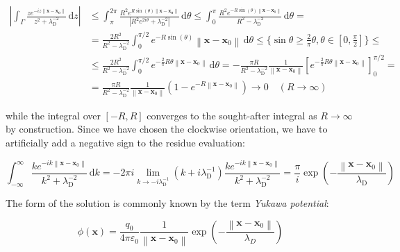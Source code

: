 \begin{align*}
    \left|\int_\Gamma\frac{ze^{-iz\|\mathbf{x}-\mathbf{x_0}\|}}{z^2+\lambda_{\mathrm{D}}^{-2}}\,\mathrm{d}z\right|&\leq\int_\pi^{2\pi}\frac{R^2e^{R \sin{\left(\theta\right)}\|\mathbf{x}-\mathbf{x_0}\|}}{\left|R^2e^{2i\theta}+\lambda_{\mathrm{D}}^{-2}\right|}\,\mathrm{d}\theta\leq\int_0^\pi \frac{R^2e^{-R \sin{\left(\theta\right)} \left\|\mathbf{x}-\mathbf{x}_0\right\|}}{R^2-\lambda_{\mathrm{D}}^{-2}}\,\mathrm{d}\theta=\\
    &=\frac{2R^2}{R^2-\lambda_{\mathrm{D}}^{-2}}\int_0^{\pi/2}{e^{-R \sin{\left(\theta\right)}}\left\|\mathbf{x}-\mathbf{x}_0\right\|}\,\mathrm{d}\theta\leq\bigg\{\sin{\theta}\geq\frac{2}{\pi}\theta,\theta\in \left[0,\frac{\pi}{2}\right]\bigg\}\leq\\
    &\leq \frac{2R^2}{R^2-\lambda_{\mathrm{D}}^{-2}}\int_0^{\pi/2}e^{-\frac{2}{\pi}R\theta \left\|\mathbf{x}-\mathbf{x}_0\right\|}\,\mathrm{d}\theta=-\frac{\pi R}{R^2-\lambda_{\mathrm{D}}^{-2}}\frac{1}{\left\|\mathbf{x}-\mathbf{x}_0\right\|}\left[e^{-\frac{2}{\pi}R\theta \left\|\mathbf{x}-\mathbf{x}_0\right\|}\right]_0^{\pi/2}=\\
    &=\frac{\pi R}{R^2-\lambda_{\mathrm{D}}^{-2}}\frac{1}{\left\|\mathbf{x}-\mathbf{x}_0\right\|}\left(1-e^{-R \left\|\mathbf{x}-\mathbf{x}_0\right\|}\right)\longrightarrow 0\quad \left(R\to\infty\right)
\end{align*}

while the integral over $[-R,R]$ converges to the sought-after integral as $R\to\infty$ by construction. Since we have chosen the clockwise orientation, we have to artificially add a negative sign to the residue evaluation:

\begin{equation*}
    \int_{-\infty}^\infty \frac{ke^{-ik \left\|\mathbf{x}-\mathbf{x}_0\right\|}}{k^2+\lambda_{\mathrm{D}}^{-2}}\,\mathrm{d}k=-2\pi i\lim_{k\to -i\lambda_{\mathrm{D}}^{-1}}\left(k+i\lambda_{\mathrm{D}}^{-1}\right)\frac{ke^{-ik \left\|\mathbf{x}-\mathbf{x}_0\right\|}}{k^2+\lambda_{\mathrm{D}}^{-2}}=\frac{\pi}{i}\exp{\left(-\frac{\left\|\mathbf{x}-\mathbf{x}_0\right\|}{\lambda_{\mathrm{D}}}\right)}
\end{equation*}

The form of the solution is commonly known by the term \textit{Yukawa potential}:

\begin{equation}
    \label{yukawa}
    \phi(\mathbf{x})=\frac{q_0}{4\pi \varepsilon_0}\frac{1}{\left\|\mathbf{x}-\mathbf{x}_0\right\|}\exp{\left(-\frac{\left\|\mathbf{x}-\mathbf{x}_0\right\|}{\lambda_D}\right)}
\end{equation}


